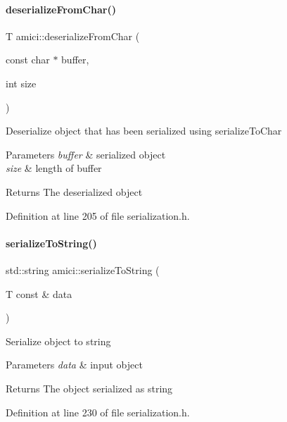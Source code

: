 \paragraph{\texorpdfstring{deserialize\+From\+Char()}{deserializeFromChar()}}
{\footnotesize\ttfamily T amici\+::deserialize\+From\+Char (\begin{DoxyParamCaption}\item[{const char $\ast$}]{buffer,  }\item[{int}]{size }\end{DoxyParamCaption})}

Deserialize object that has been serialized using serialize\+To\+Char


\begin{DoxyParams}{Parameters}
{\em buffer} & serialized object \\
\hline
{\em size} & length of buffer\\
\hline
\end{DoxyParams}
\begin{DoxyReturn}{Returns}
The deserialized object
\end{DoxyReturn}


Definition at line 205 of file serialization.\+h.

\mbox{\label{namespaceamici_aed4ae7f193798ade342a0f70491e849e}} 
\paragraph{\texorpdfstring{serialize\+To\+String()}{serializeToString()}}
{\footnotesize\ttfamily std\+::string amici\+::serialize\+To\+String (\begin{DoxyParamCaption}\item[{T const \&}]{data }\end{DoxyParamCaption})}

Serialize object to string


\begin{DoxyParams}{Parameters}
{\em data} & input object\\
\hline
\end{DoxyParams}
\begin{DoxyReturn}{Returns}
The object serialized as string
\end{DoxyReturn}


Definition at line 230 of file serialization.\+h.

